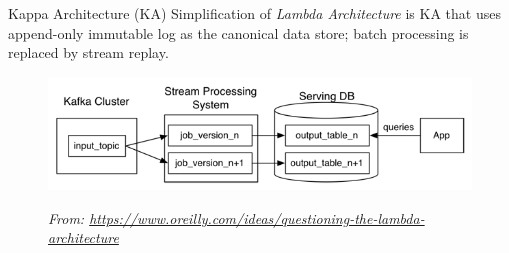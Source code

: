 \documentclass[newPxFont]{beamer}
\renewcommand{\event}[3][e]{%
  \pgfmathsetlength\xstop{(#2-\theyearstart)*\unit}%
  \ifx #1e%
    \draw[fill=black,draw=none,opacity=0.5]%
      (\xstop, 0) circle (.2\unit)%
      node[opacity=1,rotate=45,right=.2\unit] {#3};%
  \else%
    \pgfmathsetlength\xstart{(#1-\theyearstart)*\unit}%
    \draw[fill=black,draw=none,opacity=0.5,rounded corners=.1\unit]%
      (\xstart,-.1\unit) rectangle%
      node[opacity=1,rotate=45,right=.2\unit] {#3} (\xstop,.1\unit);%
  \fi}%
\begin{document}
\begin{frame}[c]{Kappa Architecture (KA)}
Simplification of \textit{Lambda Architecture} is KA that uses append-only immutable log as the canonical data store; batch processing is replaced by stream replay. \\

\vspace{1em}

\begin{figure}
		\centering
		\includegraphics[width=0.75\linewidth]{kappa.png}
		\label{fig-kappa}
		\caption{\tiny\textit{From: \url{https://www.oreilly.com/ideas/questioning-the-lambda-architecture}}}
	\end{figure}

\end{frame}





\end{document}
